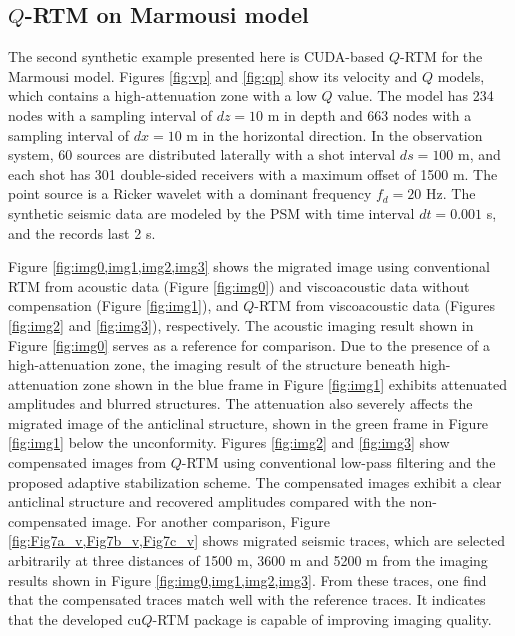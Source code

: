 
\subsection{$Q$-RTM on Marmousi model}

The second synthetic example presented here is CUDA-based $Q$-RTM for the Marmousi model. Figures \ref{fig:vp} and \ref{fig:qp} show its velocity and $Q$ models, which contains a high-attenuation zone with a low $Q$ value. The model has 234 nodes with a sampling interval of $dz=10$ m in depth and 663 nodes with a sampling interval of $dx=10$ m  in the horizontal direction. In the observation system, 60 sources are distributed laterally with a shot interval $ds=100$ m, and each shot has 301 double-sided receivers with a maximum offset of 1500 m.  The point source is a Ricker wavelet with a dominant frequency $f_d=20$ Hz. The synthetic seismic data are modeled by the PSM with time interval $dt=0.001$ s, and the records last 2 s.  

Figure \ref{fig:img0,img1,img2,img3} shows the migrated image using conventional RTM from acoustic data (Figure \ref{fig:img0}) and viscoacoustic data without compensation (Figure \ref{fig:img1}), and $Q$-RTM from viscoacoustic data (Figures \ref{fig:img2} and \ref{fig:img3}), respectively. The acoustic imaging result shown in Figure \ref{fig:img0} serves as a reference for comparison. Due to the presence of a high-attenuation zone,  the imaging result of the structure beneath high-attenuation zone shown in the blue frame in Figure \ref{fig:img1} exhibits attenuated amplitudes and blurred structures. The attenuation also severely affects the migrated image of the anticlinal structure, shown in the green frame in Figure \ref{fig:img1} below the unconformity. Figures \ref{fig:img2} and \ref{fig:img3} show compensated images from $Q$-RTM using conventional low-pass filtering and the proposed adaptive stabilization scheme. The compensated images exhibit a clear anticlinal structure and recovered amplitudes compared with the non-compensated image. For another comparison, Figure \ref{fig:Fig7a_v,Fig7b_v,Fig7c_v} shows migrated seismic traces, which are selected arbitrarily at three distances of 1500 m, 3600 m and 5200 m from the imaging results shown in Figure \ref{fig:img0,img1,img2,img3}. From these traces, one find that the compensated traces match well with the reference traces. It indicates that the developed cu$Q$-RTM package is capable of improving imaging quality. 

